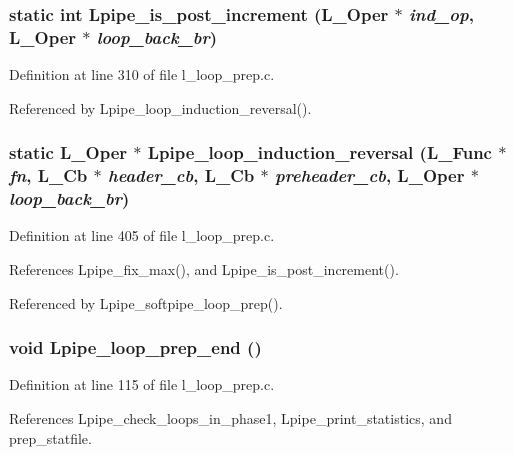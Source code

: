 \subsubsection{\setlength{\rightskip}{0pt plus 5cm}static int Lpipe\_\-is\_\-post\_\-increment (L\_\-Oper $\ast$ {\em ind\_\-op}, L\_\-Oper $\ast$ {\em loop\_\-back\_\-br})\hspace{0.3cm}{\tt  [static]}}\label{l__loop__prep_8c_7a5c72b5abaa652ae2341191045d9e2d}




Definition at line 310 of file l\_\-loop\_\-prep.c.

Referenced by Lpipe\_\-loop\_\-induction\_\-reversal().
\subsubsection{\setlength{\rightskip}{0pt plus 5cm}static L\_\-Oper $\ast$ Lpipe\_\-loop\_\-induction\_\-reversal (L\_\-Func $\ast$ {\em fn}, L\_\-Cb $\ast$ {\em header\_\-cb}, L\_\-Cb $\ast$ {\em preheader\_\-cb}, L\_\-Oper $\ast$ {\em loop\_\-back\_\-br})\hspace{0.3cm}{\tt  [static]}}\label{l__loop__prep_8c_05e15e20cb9123ceba439ef594aee91a}




Definition at line 405 of file l\_\-loop\_\-prep.c.

References Lpipe\_\-fix\_\-max(), and Lpipe\_\-is\_\-post\_\-increment().

Referenced by Lpipe\_\-softpipe\_\-loop\_\-prep().
\subsubsection{\setlength{\rightskip}{0pt plus 5cm}void Lpipe\_\-loop\_\-prep\_\-end ()}\label{l__loop__prep_8c_bbe8166961529f868de1ab8ed3cd6ba3}




Definition at line 115 of file l\_\-loop\_\-prep.c.

References Lpipe\_\-check\_\-loops\_\-in\_\-phase1, Lpipe\_\-print\_\-statistics, and prep\_\-statfile.
